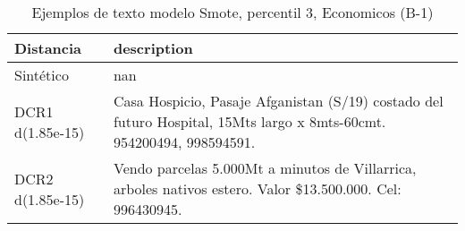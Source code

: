 \begin{table}[H]
\centering
\fontsize{10}{14}\selectfont
\caption{Ejemplos de texto modelo Smote, percentil 3, Economicos (B-1)}
\label{table-example-economicos-b-1-smote-enc-3p-text}
\begin{tabular}{|l|m{35em}|}
\hline
\rowcolor[gray]{0.8}
Distancia & description \\
\hline Sintético & nan \\
\hline DCR1 d(1.85e-15) & Casa Hospicio, Pasaje Afganistan (S/19) costado del futuro Hospital, 15Mts largo x 8mts-60cmt. 954200494, 998594591. \\
\hline DCR2 d(1.85e-15) & Vendo parcelas 5.000Mt a minutos de Villarrica, arboles nativos estero. Valor \$13.500.000. Cel: 996430945. \\
\hline
\end{tabular}
\end{table}
